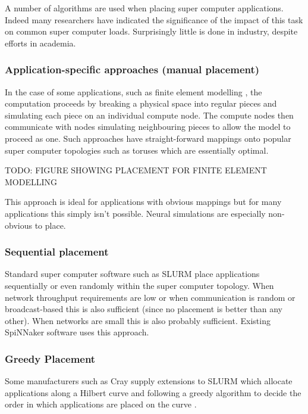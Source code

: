 			A number of algorithms are used when placing super computer applications.
			Indeed many researchers have indicated the significance of the impact of
			this task on common super computer loads. Surprisingly little is done in
			industry, despite efforts in academia.
			
			\subsubsection{Application-specific approaches (manual placement)}
				
				In the case of some applications, such as finite element modelling
				\cite{clausen10}, the computation proceeds by breaking a physical space
				into regular pieces and simulating each piece on an individual compute
				node. The compute nodes then communicate with nodes simulating
				neighbouring pieces to allow the model to proceed as one. Such
				approaches have straight-forward mappings onto popular super computer
				topologies such as toruses which are essentially optimal.
				
				TODO: FIGURE SHOWING PLACEMENT FOR FINITE ELEMENT MODELLING
				
				This approach is ideal for applications with obvious mappings but for
				many applications this simply isn't possible. Neural simulations are
				especially non-obvious to place.
			
			\subsubsection{Sequential placement}
				
				Standard super computer software such as SLURM place applications
				sequentially or even randomly within the super computer topology. When
				network throughput requirements are low or when communication is random
				or broadcast-based this is also sufficient (since no placement is
				better than any other). When networks are small this is also probably
				sufficient. Existing SpiNNaker software uses this approach.
			
			\subsubsection{Greedy Placement}
				
				Some manufacturers such as Cray supply extensions to SLURM which
				allocate applications along a Hilbert curve and following a greedy
				algorithm to decide the order in which applications are placed on the
				curve \cite{yoo03}.
				
